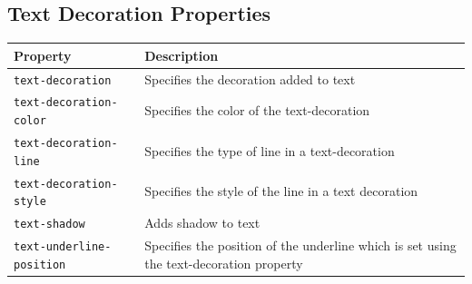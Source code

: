 \documentclass[11pt, letterpaper]{article}
\begin{document}
		\subsection{Text Decoration Properties}
			\begin{longtable}{p{5cm} p{10cm}}
				\toprule
				Property & Description \\\midrule 
				\texttt{text-decoration} & Specifies the decoration added to text \\\midrule
				\texttt{text-decoration-color} & Specifies the color of the text-decoration \\\midrule
				\texttt{text-decoration-line} & Specifies the type of line in a text-decoration \\\midrule
				\texttt{text-decoration-style} & Specifies the style of the line in a text decoration \\\midrule
				\texttt{text-shadow} & Adds shadow to text \\\midrule
				\texttt{text-underline-position} & Specifies the position of the underline which is set using the text-decoration property \\\midrule
			\end{longtable}
\end{document}
